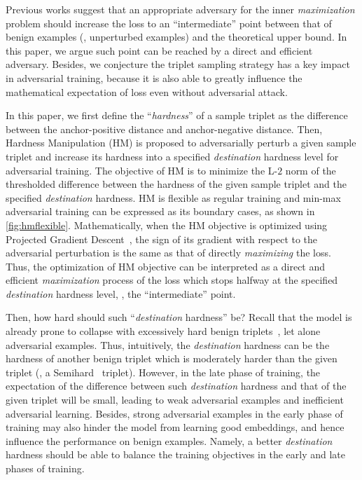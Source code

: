 \documentclass[10pt,twocolumn,letterpaper]{article}
\begin{document}

Previous works suggest that an appropriate adversary for the inner
\emph{maximization} problem should increase the loss to an ``intermediate''
point between that of benign examples (\ie, unperturbed examples) and the
theoretical upper bound.
%
In this paper, we argue such point can be reached by a direct and efficient
adversary.
%
Besides, we conjecture the triplet sampling strategy has a key impact in
adversarial training, because it is also able to greatly influence the
mathematical expectation of loss even without adversarial attack.


In this paper, we first define the ``\emph{hardness}'' of a sample triplet as
the difference between the anchor-positive distance and anchor-negative
distance.
%
Then, Hardness Manipulation (HM) is proposed to adversarially perturb a given
sample triplet and increase its hardness into a specified \emph{destination}
hardness level for adversarial training.
%
The objective of HM is to minimize the L-$2$ norm of the thresholded difference
between the hardness of the given sample triplet and the specified
\emph{destination} hardness.
%
HM is flexible as regular training and min-max adversarial training
can be expressed as its boundary cases, as shown in \cref{fig:hmflexible}.
%
Mathematically, when the HM objective is optimized using Projected Gradient
Descent~\cite{madry}, the sign of its gradient with respect to the adversarial
perturbation is the same as that of directly \emph{maximizing} the loss.
%
Thus, the optimization of HM objective can be interpreted as a direct and
efficient \emph{maximization} process of the loss which stops halfway at the
specified \emph{destination} hardness level, \ie, the ``intermediate'' point.


Then, how hard should such ``\emph{destination} hardness'' be?
%
Recall that the model is already prone to collapse with excessively hard benign
triplets~\cite{facenet}, let alone adversarial examples.
%
Thus, intuitively, the \emph{destination} hardness can be the hardness of
another benign triplet which is moderately harder than the given triplet (\eg,
a Semihard~\cite{facenet} triplet).
%
However, in the late phase of training, the expectation of the difference
between such \emph{destination} hardness and that of the given triplet will be
small, leading to weak adversarial examples and inefficient adversarial
learning.
%
Besides, strong adversarial examples in the early phase of training may also
hinder the model from learning good embeddings, and hence influence the
performance on benign examples.
%
Namely, a better \emph{destination} hardness should be able to balance the
training objectives in the early and late phases of training.
\end{document}
